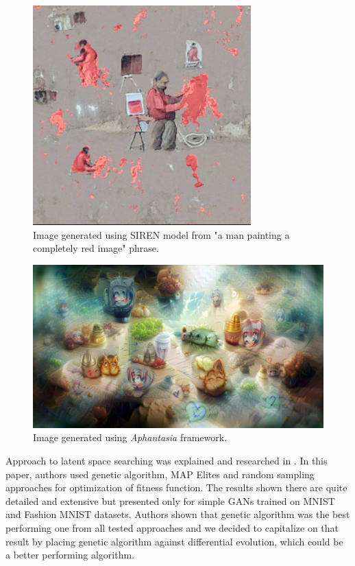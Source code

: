 \documentclass[11pt,a4paper,openany]{book}
\begin{document}
\begin{figure}[H]
    \centering
    \includegraphics[scale=1.0]{figs/deepdaze.png}
    \caption{Image generated using SIREN \cite{siren} model from "a man painting a \\ completely red image" phrase.}\label{Fig:deepdaze}
\end{figure}

\begin{figure}[H]
    \centering
    \includegraphics[scale=0.5]{figs/aphantasia.png}
    \caption{Image generated using \textit{Aphantasia} \cite{aphantasia} framework.}\label{Fig:Aphantasia}
\end{figure}

\noindent Approach to latent space searching was explained and researched in \cite{coimbra}. In this paper, authors used genetic algorithm, MAP Elites and random sampling approaches for optimization of fitness function. The results shown there are quite detailed and extensive but presented only for simple GANs trained on MNIST and Fashion MNIST datasets. Authors shown that genetic algorithm was the best performing one from all tested approaches and we decided to capitalize on that result by placing genetic algorithm against differential evolution, which could be a better performing algorithm.
\end{document}
